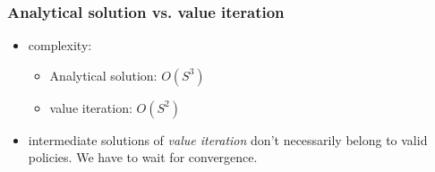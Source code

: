 \begin{frame}\frametitle{Analytical solution vs. value iteration}


\begin{itemize}
\item complexity: 
\begin{itemize}
\item Analytical solution: $O(S^{3})$
\item value iteration: $O(S^{2})$
\end{itemize}   
\item intermediate solutions of \emph{value iteration} don't necessarily belong to valid policies. We have to wait for convergence.
\end{itemize}

\end{frame}

\newpage


    
    
    
